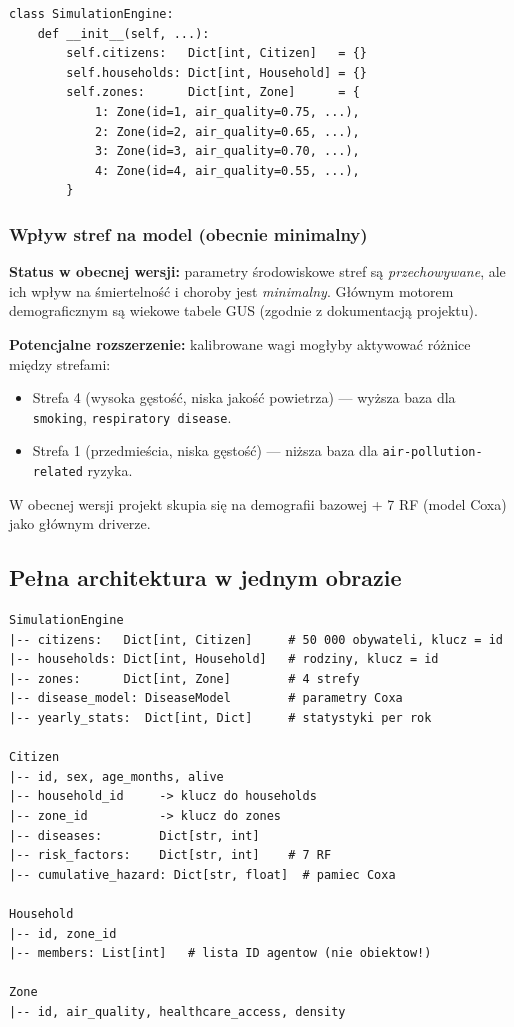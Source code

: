 \documentclass[11pt,a4paper]{article}
\begin{document}
\begin{lstlisting}
class SimulationEngine:
    def __init__(self, ...):
        self.citizens:   Dict[int, Citizen]   = {}
        self.households: Dict[int, Household] = {}
        self.zones:      Dict[int, Zone]      = {
            1: Zone(id=1, air_quality=0.75, ...),
            2: Zone(id=2, air_quality=0.65, ...),
            3: Zone(id=3, air_quality=0.70, ...),
            4: Zone(id=4, air_quality=0.55, ...),
        }
\end{lstlisting}

\subsubsection{Wpływ stref na model (obecnie minimalny)}

\begin{warnbox}
\textbf{Status w obecnej wersji:} parametry środowiskowe stref są \emph{przechowywane}, ale ich wpływ na śmiertelność i choroby jest \emph{minimalny}. Głównym motorem demograficznym są wiekowe tabele GUS (zgodnie z dokumentacją projektu).

\textbf{Potencjalne rozszerzenie:} kalibrowane wagi mogłyby aktywować różnice między strefami:
\begin{itemize}
  \item Strefa 4 (wysoka gęstość, niska jakość powietrza) --- wyższa baza dla \texttt{smoking}, \texttt{respiratory disease}.
  \item Strefa 1 (przedmieścia, niska gęstość) --- niższa baza dla \texttt{air-pollution-related} ryzyka.
\end{itemize}
W obecnej wersji projekt skupia się na demografii bazowej + 7 RF (model Coxa) jako głównym driverze.
\end{warnbox}

\subsection{Pełna architektura w jednym obrazie}

\begin{lstlisting}
SimulationEngine
|-- citizens:   Dict[int, Citizen]     # 50 000 obywateli, klucz = id
|-- households: Dict[int, Household]   # rodziny, klucz = id
|-- zones:      Dict[int, Zone]        # 4 strefy
|-- disease_model: DiseaseModel        # parametry Coxa
|-- yearly_stats:  Dict[int, Dict]     # statystyki per rok

Citizen
|-- id, sex, age_months, alive
|-- household_id     -> klucz do households
|-- zone_id          -> klucz do zones
|-- diseases:        Dict[str, int]
|-- risk_factors:    Dict[str, int]    # 7 RF
|-- cumulative_hazard: Dict[str, float]  # pamiec Coxa

Household
|-- id, zone_id
|-- members: List[int]   # lista ID agentow (nie obiektow!)

Zone
|-- id, air_quality, healthcare_access, density
\end{lstlisting}
\end{document}
